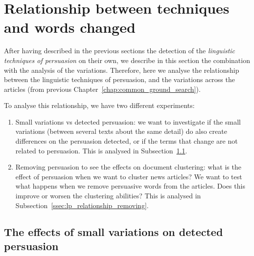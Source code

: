 \section{\statusgreen Relationship between techniques and words changed}
\label{sec:lp_relationship}

After having described in the previous sections the detection of the \emph{linguistic techniques of persuasion} on their own, we describe in this section the combination with the analysis of the variations.
Therefore, here we analyse the relationship between the linguistic techniques of persuasion, and the variations across the articles (from previous Chapter~\ref{chap:common_ground_search}).

To analyse this relationship, we have two different experiments:

\begin{enumerate}
    \item Small variations vs detected persuasion: we want to investigate if the small variations (between several texts about the same detail) do also create differences on the persuasion detected, or if the terms that change are not related to persuasion. This is analysed in Subsection~\ref{ssec:lp_relationship_small_variations}.
    \item Removing persuasion to see the effects on document clustering: what is the effect of persuasion when we want to cluster news articles? We want to test what happens when we remove persuasive words from the articles. Does this improve or worsen the clustering abilities? This is analysed in Subsection~\ref{ssec:lp_relationship_removing}. %
\end{enumerate}

\subsection{\statusgreen The effects of small variations on detected persuasion}
\label{ssec:lp_relationship_small_variations}



